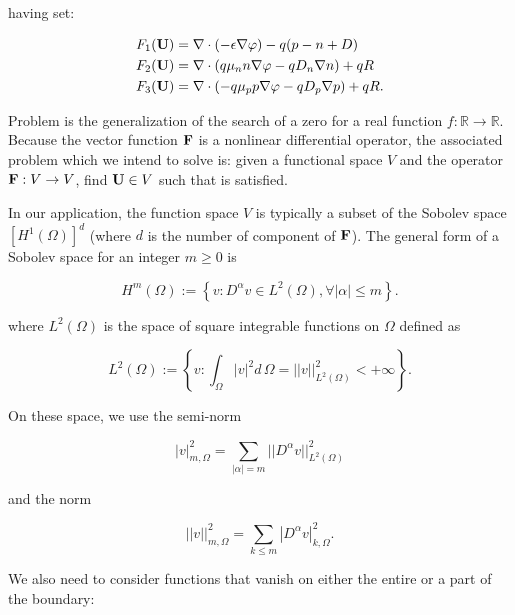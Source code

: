 having set:

\begin{align*}
F_1(\mathbf{U}) & = \nabla \cdot (-\epsilon \nabla \varphi) - q(p-n+D) \\
F_2(\mathbf{U}) & = \nabla \cdot ( q\mu_n n \nabla \varphi - qD_n \nabla n )+qR \\
F_3(\mathbf{U}) & = \nabla \cdot (- q\mu_p p \nabla \varphi - qD_p \nabla p )+qR.
\end{align*}

Problem  is the generalization of the search of a zero for a real function $f:\mathbb{R}\rightarrow\mathbb{R}$. Because the vector function $\mathbf{F}$ is a nonlinear differential operator, the associated problem which we intend to solve is: given a functional space $V$ and the operator $\mathbf{F}:V\rightarrow V$, find $\mathbf{U}\in V$ such that  is satisfied.

In our application, the function space $V$ is typically a subset of the Sobolev space  $[H^1(\Omega)]^d$ (where $d$ is the number of component of $\mathbf{F}$). 
The general form of a Sobolev space for an integer $m\geq 0$ is

\begin{equation}
\label{space: Hm}
H^m(\Omega) := \left\{ v : D^{\alpha}v\in L^2(\Omega),\forall |\alpha|\leq m \right\}.
\end{equation}

where $L^2(\Omega)$ is the space of square integrable functions on $\Omega$ defined as

\begin{equation}
\label{space: L2}
L^2(\Omega) := \left\{ v : \int_{\Omega} |v|^2 d\,\Omega =||v||^2_{L^2(\Omega)}<+\infty \right\}.
\end{equation}

On these space, we use the semi-norm

\begin{equation}
\label{eq: semiorm sobolev}
|v|_{m,\Omega}^2 = \sum_{|\alpha|=m} ||D^{\alpha}v||^2_{L^2(\Omega)}
\end{equation}

and the norm

\begin{equation}
\label{eq: norm sobolev}
||v||_{m,\Omega}^2 = \sum_{k\leq m} |D^{\alpha}v|^2_{k,\Omega}.
\end{equation}

We also need to consider functions that vanish on either the entire or a part of the boundary:

